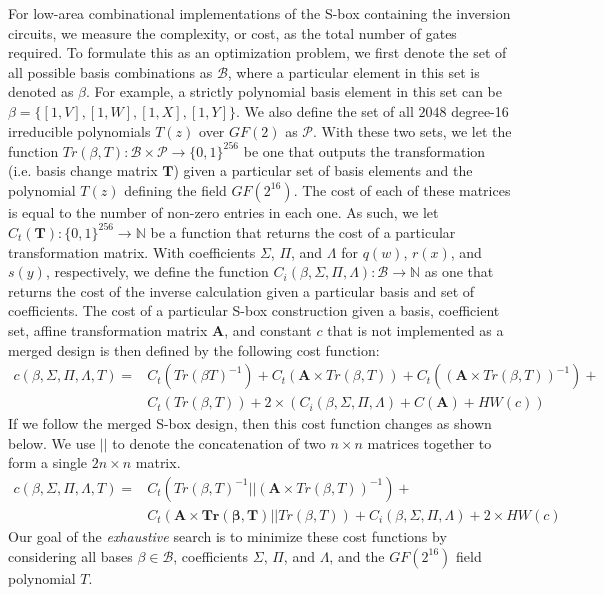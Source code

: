 For low-area combinational implementations of the S-box containing the inversion circuits, we measure the complexity, or cost, as the total number of gates required. To formulate this as an optimization problem, we first denote the set of all possible basis combinations as $\mathcal{B}$, where a particular element in this set is denoted as $\beta$. For example, a strictly polynomial basis element in this set can be $\beta = \{[1, V], [1, W], [1, X], [1, Y]\}$. We also define the set of all $2048$ degree-16 irreducible polynomials $T(z)$ over $GF(2)$ as $\mathcal{P}$. With these two sets, we let the function $Tr(\beta, T) : \mathcal{B} \times \mathcal{P} \to \{0,1\}^{256}$ be one that outputs the transformation (i.e. basis change matrix $\mathbf{T}$) given a particular set of basis elements and the polynomial $T(z)$ defining the field $GF(2^{16})$. The cost of each of these matrices is equal to the number of non-zero entries in each one. As such, we let $C_t(\mathbf{T}) : \{0,1\}^{256} \to \mathbb{N}$ be a function that returns the cost of a particular transformation matrix. With coefficients $\Sigma$, $\Pi$, and $\Lambda$ for $q(w)$, $r(x)$, and $s(y)$, respectively, we define the function $C_i(\beta, \Sigma, \Pi, \Lambda) : \mathcal{B} \to \mathbb{N}$ as one that returns the cost of the inverse calculation given a particular basis and set of coefficients. The cost of a particular S-box construction given a basis, coefficient set, affine transformation matrix $\mathbf{A}$, and constant $c$ that is not implemented as a merged design is then defined by the following cost function:
\begin{align*}
c(\beta, \Sigma, \Pi, \Lambda, T) = & C_t(Tr(\beta T)^{-1}) + C_t(\mathbf{A} \times Tr(\beta, T)) + C_t((\mathbf{A} \times Tr(\beta, T))^{-1}) + \\
& C_t(Tr(\beta, T)) + 2 \times (C_i(\beta, \Sigma, \Pi, \Lambda) + C(\mathbf{A}) + HW(c))
\end{align*}
If we follow the merged S-box design, then this cost function changes as shown below. We use $||$ to denote the concatenation of two $n \times n$ matrices together to form a single $2n \times n$ matrix.
\begin{align*}
c(\beta, \Sigma, \Pi, \Lambda, T) = & C_t(Tr(\beta, T)^{-1} || (\mathbf{A}\times Tr(\beta, T))^{-1}) + \\
& C_t(\mathbf{A\times Tr(\beta, T)} || Tr(\beta, T)) + C_i(\beta, \Sigma, \Pi, \Lambda) + 2 \times HW(c)
\end{align*}
Our goal of the \emph{exhaustive} search is to minimize these cost functions by considering all bases $\beta \in \mathcal{B}$, coefficients $\Sigma$, $\Pi$, and $\Lambda$, and the $GF(2^{16})$ field polynomial $T$. 

